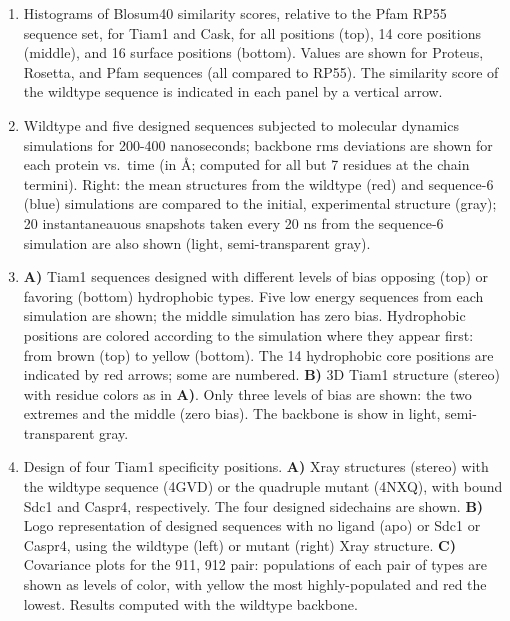 \documentclass[12pt]{article}
\begin{document}
\begin{enumerate}
\item
Histograms of Blosum40 similarity scores, relative to the Pfam RP55 sequence set, for Tiam1 and Cask, for all positions (top),
14 core positions (middle), and 16 surface positions (bottom). Values are shown for Proteus, Rosetta, and Pfam  sequences (all
compared to RP55). The similarity score of the wildtype sequence is indicated in each panel by a vertical arrow.

\item
Wildtype and five designed sequences subjected to molecular dynamics simulations for 200-400 nanoseconds; backbone rms
deviations are shown for each protein vs.\ time (in \AA; computed for all but 7 residues at the chain termini). Right:
the mean structures from the wildtype (red) and sequence-6 (blue) simulations are compared to the initial, experimental 
structure (gray); 20 instantaneauous snapshots taken every 20 ns from the sequence-6 simulation are also shown (light,
semi-transparent gray).

\item
{\bf A)} Tiam1 sequences designed with different levels of bias opposing (top) or favoring (bottom) hydrophobic types.
Five low energy sequences from each simulation are shown; the middle simulation has zero bias. Hydrophobic positions
are colored according to the simulation where they appear first: from brown (top) to yellow (bottom). The 14 hydrophobic
core positions are indicated by red arrows; some are numbered. {\bf B)} 3D Tiam1 structure (stereo) with residue colors
as in {\bf A)}. Only three levels of bias are shown: the two extremes and the middle (zero bias). The backbone is show in
light, semi-transparent gray.

\item
Design of four Tiam1 specificity positions. {\bf A)} Xray structures (stereo) with the wildtype sequence (4GVD) or the
quadruple mutant (4NXQ), with bound Sdc1 and Caspr4, respectively. The four designed sidechains are shown. {\bf B)} 
Logo representation of designed sequences with no ligand (apo) or Sdc1 or Caspr4, using the wildtype (left) or mutant (right)
Xray structure. {\bf C)} Covariance plots for the 911, 912 pair: populations of each pair of types are shown as levels of
color, with yellow the most highly-populated and red the lowest. Results computed with the wildtype backbone.

\end{enumerate}

\clearpage
\pagebreak
\end{document}
